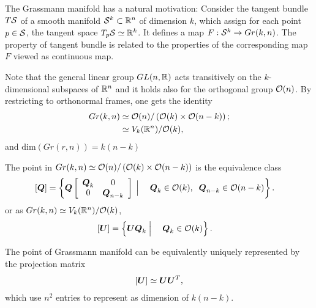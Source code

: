 \documentclass[11pt]{article}
\begin{document}
\begin{itemize}
The Grassmann manifold has a natural motivation: Consider the tangent bundle $T{\mathcal S}$ of a smooth manifold ${\mathcal S}^{k} \subset {\mathbb R}^{n}$ of dimension $k$, which assign for each point $p\in {\mathcal S}$, the tangent space $T_{p}{\mathcal S} \simeq {\mathbb R}^{k}$. It defines a map $F: {\mathcal S}^{k} \rightarrow Gr(k, n)$. The property of tangent bundle is related to the properties of the corresponding map $F$ viewed as continuous map. 


Note that the general linear group $GL(n, {\mathbb R})$ acts transitively on the $k$-dimensional subspaces of ${\mathbb R}^{n}$ and it holds also for the orthogonal group ${\mathcal O}(n)$. By restricting to orthonormal frames, one gets the identity
\begin{align*}
Gr(k,n) &\simeq  {\mathcal O}(n)/\left({\mathcal O}(k)\times {\mathcal O}(n-k)\right);\\
&\simeq V_{k}({\mathbb R}^{n})/{\mathcal O}(k),
\end{align*} and $\text{dim}(Gr(r,n)) = k(n-k)$

The point in $Gr(k,n) \simeq  {\mathcal O}(n)/\left({\mathcal O}(k)\times {\mathcal O}(n-k)\right)$ is the equivalence class 
\begin{align*}
\left[\boldsymbol{Q}\right] &= \left\{\boldsymbol{Q}\left[\begin{array}{cc}
\boldsymbol{Q}_{k} & 0 \\ 
0 & \boldsymbol{Q}_{n-k}
\end{array} \right]\;\Big| \; \quad  \boldsymbol{Q}_{k}\in {\mathcal O}(k), \;\; \boldsymbol{Q}_{n-k} \in {\mathcal O}(n-k) \right\}.
\end{align*}
or as $Gr(k,n) \simeq  V_{k}({\mathbb R}^{n})/{\mathcal O}(k)$,
\begin{align*}
\left[\boldsymbol{U}\right] &= \left\{\boldsymbol{U}\boldsymbol{Q}_{k} \;\Big| \; \quad  \boldsymbol{Q}_{k}\in {\mathcal O}(k)\right\}.
\end{align*}


The point of Grassmann manifold can be equivalently uniquely represented by the projection matrix
\begin{align*}
\left[\boldsymbol{U}\right] \simeq \boldsymbol{U}\boldsymbol{U}^{T},
\end{align*} which use $n^{2}$ entries to represent as dimension of $k(n-k)$.



\end{itemize}
\end{document}
